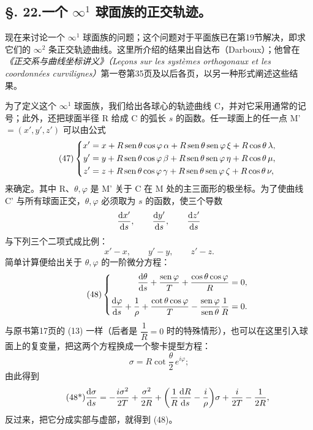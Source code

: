 \subsection*{\S. 22.\quad 一个 \(\infty^1\) 球面族的正交轨迹。}
现在来讨论一个 \(\infty^1\) 球面族的问题；这个问题对于平面族已在第19节解决，即求它们的 \(\infty^2\) 条正交轨迹曲线。这里所介绍的结果出自达布（Darboux）；他曾在\emph{《正交系与曲线坐标讲义》（Leçons sur les systèmes orthogonaux et les coordonnées curvilignes）}第一卷第35页及以后各页，以另一种形式阐述这些结果。

为了定义这个 \(\infty^1\) 球面族，我们给出各球心的轨迹曲线 C，并对它采用通常的记号；此外，还把球面半径 R 给成 C 的弧长 \(s\) 的函数。任一球面上的任一点 M'\(=(x',y',z')\) 可以由公式
\begin{equation}\tag{47}
\left\{
\begin{aligned}
x'&=x+R\operatorname{sen}\theta\cos\varphi\,\alpha+R\operatorname{sen}\theta\operatorname{sen}\varphi\,\xi+R\cos\theta\,\lambda,\\
y'&=y+R\operatorname{sen}\theta\cos\varphi\,\beta+R\operatorname{sen}\theta\operatorname{sen}\varphi\,\eta+R\cos\theta\,\mu,\\
z'&=z+R\operatorname{sen}\theta\cos\varphi\,\gamma+R\operatorname{sen}\theta\operatorname{sen}\varphi\,\zeta+R\cos\theta\,\nu,
\end{aligned}\right.
\end{equation}
来确定。其中 R、\(\theta,\varphi\) 是 M' 关于 C 在 M 处的主三面形的极坐标。为了使曲线 C' 与所有球面正交，\(\theta,\varphi\) 必须取为 \(s\) 的函数，使三个导数
\[
\frac{\mathrm{d} x'}{\mathrm{d} s},
\qquad
\frac{\mathrm{d} y'}{\mathrm{d} s},
\qquad
\frac{\mathrm{d} z'}{\mathrm{d} s}
\]
与下列三个二项式成比例：
\[
x'-x,
\qquad y'-y,
\qquad z'-z.
\]
简单计算便给出关于 \(\theta,\varphi\) 的一阶微分方程：
\begin{equation}\tag{48}
\left\{
\begin{aligned}
\frac{\mathrm{d}\theta}{\mathrm{d} s}+\frac{\operatorname{sen}\varphi}{T}+\frac{\cos\theta\cos\varphi}{R}&=0,\\[0.4em]
\frac{\mathrm{d}\varphi}{\mathrm{d} s}+\frac{1}{\rho}+\frac{\cot\theta\cos\varphi}{T}-\frac{\operatorname{sen}\varphi}{\operatorname{sen}\theta}\frac{1}{R}&=0.
\end{aligned}\right.
\end{equation}
与原书第17页的 (13) 一样（后者是 \(\dfrac{1}{R}=0\) 时的特殊情形），也可以在这里引入球面上的复变量，把这两个方程换成一个黎卡提型方程：
\[
\sigma=R\cot\frac{\theta}{2}\,e^{i\varphi};
\]
由此得到
\begin{equation}\tag{48*}
\frac{\mathrm{d}\sigma}{\mathrm{d} s}=-\frac{i\sigma^2}{2T}+\frac{\sigma^2}{2R}+\biggl(\frac{1}{R}\frac{\mathrm{d} R}{\mathrm{d} s}-\frac{i}{\rho}\biggr)\sigma+\frac{i}{2T}-\frac{1}{2R},
\end{equation}
反过来，把它分成实部与虚部，就得到 (48)。

